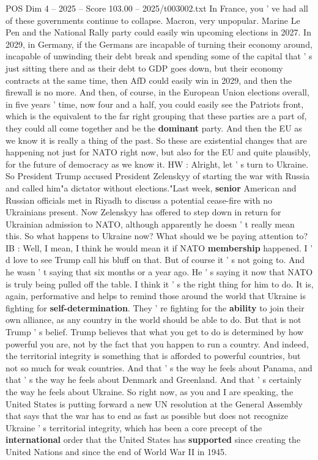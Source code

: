 \begin{textsample}{POS Dim 4 – 2025 – Score 103.00 – 2025/t003002.txt}
In France, you ' ve had all of these governments continue to collapse.
Macron, very unpopular.
Marine Le Pen and the National Rally party could easily win upcoming elections in 2027.
In 2029, in Germany, if the Germans are incapable of turning their economy around, incapable of unwinding their debt break and spending some of the capital that ' s just sitting there and as their debt to GDP goes down, but their economy contracts at the same time, then AfD could easily win in 2029, and then the firewall is no more.
And then, of course, in the European Union elections overall, in five years ' time, now four and a half, you could easily see the Patriots front, which is the equivalent to the far right grouping that these parties are a part of, they could all come together and be the \textbf{dominant} party.
And then the EU as we know it is really a thing of the past.
So these are existential changes that are happening not just for NATO right now, but also for the EU and quite plausibly, for the future of democracy as we know it.
HW : Alright, let ' s turn to Ukraine.
So President Trump accused President Zelenskyy of starting the war with Russia and called him"a dictator without elections."Last week, \textbf{senior} American and Russian officials met in Riyadh to discuss a potential cease-fire with no Ukrainians present.
Now Zelenskyy has offered to step down in return for Ukrainian admission to NATO, although apparently he doesn ' t really mean this.
So what happens to Ukraine now?
What should we be paying attention to?
IB : Well, I mean, I think he would mean it if NATO \textbf{membership} happened.
I ' d love to see Trump call his bluff on that.
But of course it ' s not going to.
And he wasn ' t saying that six months or a year ago.
He ' s saying it now that NATO is truly being pulled off the table.
I think it ' s the right thing for him to do.
It is, again, performative and helps to remind those around the world that Ukraine is fighting for \textbf{self-determination}.
They ' re fighting for the \textbf{ability} to join their own alliance, as any country in the world should be able to do.
But that is not Trump ' s belief.
Trump believes that what you get to do is determined by how powerful you are, not by the fact that you happen to run a country.
And indeed, the territorial integrity is something that is afforded to powerful countries, but not so much for weak countries.
And that ' s the way he feels about Panama, and that ' s the way he feels about Denmark and Greenland.
And that ' s certainly the way he feels about Ukraine.
So right now, as you and I are speaking, the United States is putting forward a new UN resolution at the General Assembly that says that the war has to end as fast as possible but does not recognize Ukraine ' s territorial integrity, which has been a core precept of the \textbf{international} order that the United States has \textbf{supported} since creating the United Nations and since the end of World War II in 1945.

\end{textsample}
